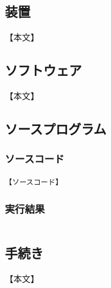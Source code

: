 \documentclass[a4paper, papersize]{jsarticle}
\begin{document}
\begin{multicols}{2}

  \subsection{装置}
  【本文】


  \subsection{ソフトウェア}
  【本文】


  \subsection{ソースプログラム}


  \subsubsection{ソースコード}

  \setcounter{lstlisting}{4}
  \renewcommand{\lstlistingname}{ソースコード}
  \begin{lstlisting}[caption = 【ファイル名】, label=【参照名】]
【ソースコード】
\end{lstlisting}


  \setcounter{lstlisting}{2}
  \renewcommand{\lstlistingname}{実行結果}
  \subsubsection{実行結果}
  \setcounter{lstlisting}{0}
  \renewcommand{\lstlistingname}{実行結果}
  \begin{lstlisting}[caption = 【ファイル名】 \quad 【ファイル名】, label = 【参照名】]
\end{lstlisting}


  \subsection{手続き}
  【本文】



\end{multicols}
\end{document}
